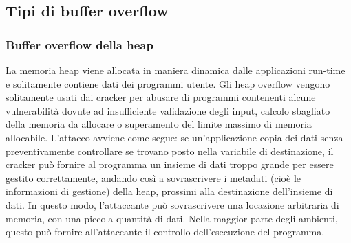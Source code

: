 \documentclass[8pt]{extarticle}
\begin{document}
\subsection{Tipi di buffer overflow}
\subsubsection{Buffer overflow della heap}
La memoria heap viene allocata in maniera dinamica dalle applicazioni run-time e solitamente contiene 
dati dei programmi utente. Gli heap overflow vengono solitamente usati dai cracker per abusare di 
programmi contenenti alcune vulnerabilità dovute ad insufficiente validazione degli input, calcolo 
sbagliato della memoria da allocare o superamento del limite massimo di memoria allocabile. 
L'attacco avviene come segue: se un'applicazione copia dei dati senza preventivamente controllare 
se trovano posto nella variabile di destinazione, il cracker può fornire al programma un insieme di 
dati troppo grande per essere gestito correttamente, andando così a sovrascrivere i metadati (cioè le 
informazioni di gestione) della heap, prossimi alla destinazione dell'insieme di dati. In questo modo, 
l'attaccante può sovrascrivere una locazione arbitraria di memoria, con una piccola quantità di dati. 
Nella maggior parte degli ambienti, questo può fornire all'attaccante il controllo dell'esecuzione del 
programma. 
\end{document}
